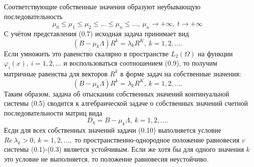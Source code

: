 \documentclass[9pt, a4paper]{extarticle}
\numberwithin{equation}{section}
\numberwithin{lemma}{section}
\numberwithin{definition}{section}
\numberwithin{notabene}{section}
\numberwithin{corollary}{section}
\begin{document}
	Соответствующие собственные значения образуют неубывающую последовательность
	\begin{equation*}
		\mu_0 \leq \mu_1 \leq \mu_2 \leq \dots \leq \mu_n \leq \dots, \ \mu_n \to + \infty, \ t \to +\infty
	\end{equation*}
	С учётом представления (0.7) исходная задача принимает вид 
	\begin{equation*}
		\left(B - \mu_k \Lambda\right) R^k = \lambda_k R^K, \ k = 1,2, \dots.
	\end{equation*}
	Если умножить это равенство скалярно в пространстве $L_2(\Omega)$ на функции $\varphi_i(x),\ i=1,2,\dots$ и воспользоваться соотношением (0.9), то получим матричные равенства для векторов $R^k$ в форме задач на собственные значения:
	\begin{equation}
		\left(B - \mu_k \Lambda\right) R^k = \lambda_k R^K, \ k = 1,2, \dots.
	\end{equation}
	Таким образом, задача об отыскании собственных значений континуальной системы (0.5) сводится к алгебраической задаче о собственных значений счетной последовательности  матриц вида
	\begin{equation}
		D_k = B - \mu_k \Lambda, \ k =1, 2, \dots .
	\end{equation}
	Есди для всех собственных значений задачи (0.10) выполняется условие $Re\ \lambda_k > 0, \ k =1,2,\dots, $ то пространственно-однородное положение равновесия $v$ системы (0.1)-(0.3) является устойчивым.\newline
	Если же хотя бы для одного значения $k$ это условие не выполняется, то положение равновесия неустойчиво. \newline
	
\end{document}
